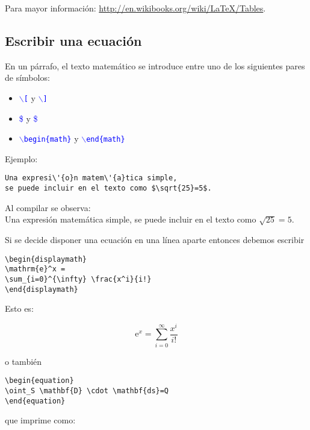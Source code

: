 \noindent Para mayor información: \url{http://en.wikibooks.org/wiki/LaTeX/Tables}.

\subsection{Escribir una ecuación}

En un p\'{a}rrafo, el texto matem\'{a}tico se introduce entre uno de los siguientes pares de s\'{i}mbolos: 
\begin{itemize}
\item \textcolor{blue}{$\backslash$\texttt{[}} y \textcolor{blue}{$\backslash$\texttt{]}} 
\item \textcolor{blue}{\$} y \textcolor{blue}{\$} 
\item \textcolor{blue}{$\backslash$\texttt{begin\{math\}}} y \textcolor{blue}{$\backslash$\texttt{end\{math\}}}
\end{itemize}

Ejemplo: 

\begin{verbatim}
Una expresi\'{o}n matem\'{a}tica simple,
se puede incluir en el texto como $\sqrt{25}=5$.
\end{verbatim}  

Al compilar se observa:\\
Una expresi\'{o}n matem\'{a}tica simple, se puede incluir en el texto como $\sqrt{25}=5$.

Si se decide disponer una ecuaci\'{o}n en una l\'{i}nea aparte entonces debemos escribir 

\begin{lstlisting}[frame=single]
\begin{displaymath}
\mathrm{e}^x =
\sum_{i=0}^{\infty} \frac{x^i}{i!}
\end{displaymath}
\end{lstlisting}

Esto es:

\begin{displaymath}
\mathrm{e}^x =
\sum_{i=0}^{\infty}
\frac{x^i}{i!}
\end{displaymath}

o tambi\'{e}n

\begin{lstlisting}[frame=single]
\begin{equation}
\oint_S \mathbf{D} \cdot \mathbf{ds}=Q
\end{equation}
\end{lstlisting}

que imprime como:

